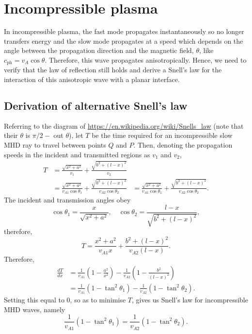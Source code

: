 \documentclass[12pt]{article}
\begin{document}
	
	\section{Incompressible plasma}
	In incompressible plasma, the fast mode propagates instantaneously so no longer transfers energy and the slow mode propagates at a speed which depends on the angle between the propagation direction and the magnetic field, $\theta$, like $c_\text{ph} = v_A\cos{\theta}$. Therefore, this wave propagates anisotropically. Hence, we need to verify that the law of reflection still holds and derive a Snell's law for the interaction of this anisotropic wave with a planar interface.
	
	\subsection{Derivation of alternative Snell's law}
	Referring to the diagram of \url{https://en.wikipedia.org/wiki/Snells_law} (note that their $\theta$ is $\pi/2 -$ out $\theta$), let $T$ be the time required for an incompressible slow MHD ray to travel between points $Q$ and $P$. Then, denoting the propagation speeds in the incident and transmitted regions as $v_1$ and $v_2$,
	\begin{align}
	T &= \frac{\sqrt{x^2 + a^2}}{v_1} + \frac{\sqrt{b^2 + (l - x)^2}}{v_2} \\
	&= \frac{\sqrt{x^2 + a^2}}{v_{A1}\cos{\theta_1}} + \frac{\sqrt{b^2 + (l - x)^2}}{v_{A2}\cos{\theta_2}}
	&= \frac{\sqrt{x^2 + a^2}}{v_{A1}\cos{\theta_1}} + \frac{\sqrt{b^2 + (l - x)^2}}{v_{A2}\cos{\theta_2}}.
	\end{align}
	The incident and transmission angles obey
	\begin{equation}
	\cos{\theta_1} = \frac{x}{\sqrt{x^2 + a^2}}, \quad \cos{\theta_2} = \frac{l - x}{\sqrt{b^2 + (l - x)^2}},
	\end{equation}
	therefore,
	\begin{equation}
	T = \frac{x^2 + a^2}{v_{A1}x} + \frac{b^2 + (l - x)^2}{v_{A2}(l - x)}.
	\end{equation}
	Therefore,
	\begin{align}
	\frac{dT}{dx} &= \frac{1}{v_{A1}}\left( 1 - \frac{a^2}{x^2} \right) - \frac{1}{v_{A2}}\left( 1 - \frac{b^2}{(l - x)^2} \right) \\
	&= \frac{1}{v_{A1}}\left( 1 - \tan^2{\theta_1} \right) - \frac{1}{v_{A2}}\left( 1 - \tan^2{\theta_2} \right).
	\end{align}
	Setting this equal to 0, so as to minimise $T$, gives us Snell's law for incompressible MHD waves, namely
	\begin{equation}
	\frac{1}{v_{A1}}\left( 1 - \tan^2{\theta_1} \right) = \frac{1}{v_{A2}}\left( 1 - \tan^2{\theta_2} \right).
	\end{equation}
	
\end{document}
